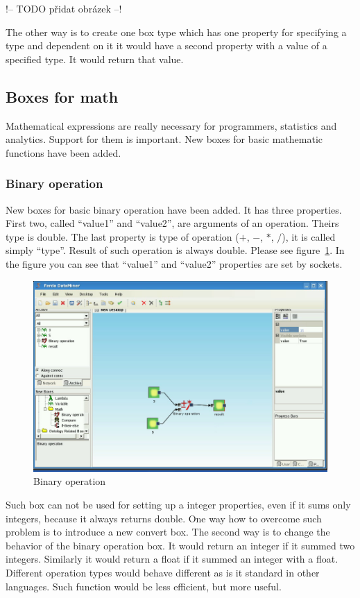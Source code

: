 \documentclass[a4paper,12pt]{book}
\begin{document}
!-- TODO přidat obrázek --!

The other way is to create one box type which has one property for specifying a type and dependent on it it would have a second property with a value of a specified type. It would return that value.

\subsection{Boxes for math}
Mathematical expressions are really necessary for programmers, statistics and analytics. Support for them is important. New boxes for basic mathematic functions have been added.

\subsubsection{Binary operation}
New boxes for basic binary operation have been added. It has three properties. First two, called ``value1'' and ``value2'', are arguments of an operation. Theirs type is double. The last property is type of operation ($+$, $-$, $*$, $/$), it is called simply ``type''. Result of such operation is always double. Please see figure~\ref{fig:boxBinaryOperation}. In the figure you can see that ``value1'' and ``value2'' properties are set by sockets.
\begin{figure}
	\includegraphics[width=1\textwidth]{binaryOperation2.png}
	\caption{Binary operation}
	\label{fig:boxBinaryOperation}
\end{figure}

Such box can not be used for setting up a integer properties, even if it sums only integers, because it always returns double. One way how to overcome such problem is to introduce a new convert box. The second way is to change the behavior of the binary operation box. It would return an integer if it summed two integers. Similarly it would return a float if it summed an integer with a float. Different operation types would behave different as is it standard in other languages. Such function would be less efficient, but more useful.  
\end{document}
